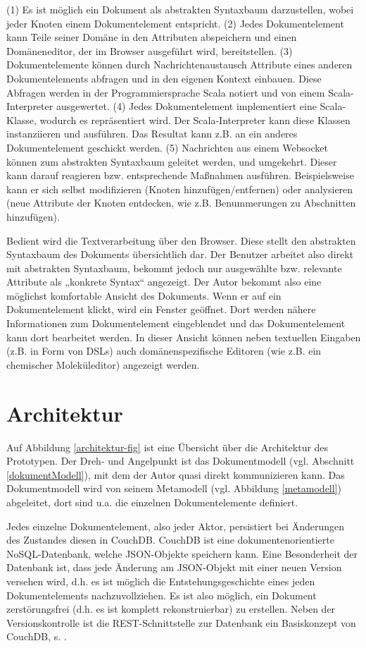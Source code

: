 (1) Es ist möglich ein Dokument als abstrakten Syntaxbaum darzustellen, wobei jeder Knoten einem Dokumentelement entspricht. (2) Jedes Dokumentelement kann Teile seiner Domäne in den Attributen abspeichern und einen Domäneneditor, der im Browser ausgeführt wird, bereitstellen. (3) Dokumentelemente können durch Nachrichtenaustausch Attribute eines anderen Dokumentelements abfragen und in den eigenen Kontext einbauen. Diese Abfragen werden in der Programmiersprache Scala notiert und von einem Scala-Interpreter ausgewertet. (4) Jedes Dokumentelement implementiert eine Scala-Klasse, wodurch es repräsentiert wird. Der Scala-Interpreter kann diese Klassen instanziieren und ausführen. Das Resultat kann z.B. an ein anderes Dokumentelement geschickt werden. (5) Nachrichten aus einem Websocket können zum abstrakten Syntaxbaum geleitet werden, und umgekehrt. Dieser kann darauf reagieren bzw. entsprechende Maßnahmen ausführen. Beispielsweise kann er sich selbst modifizieren (Knoten hinzufügen/entfernen) oder analysieren (neue Attribute der Knoten entdecken, wie z.B. Benummerungen zu Abschnitten hinzufügen).

 
Bedient wird die Textverarbeitung über den Browser. Diese stellt den abstrakten Syntaxbaum des Dokuments übersichtlich dar. Der Benutzer arbeitet also direkt mit abstrakten Syntaxbaum, bekommt jedoch nur ausgewählte bzw. relevante Attribute als „konkrete Syntax“ angezeigt. Der Autor bekommt also eine möglichst komfortable Ansicht des Dokuments. Wenn er auf ein Dokumentelement klickt, wird ein Fenster geöffnet. Dort werden nähere Informationen zum Dokumentelement eingeblendet und das Dokumentelement kann dort bearbeitet werden. In dieser Ansicht können neben textuellen Eingaben (z.B. in Form von DSLs) auch domänenspezifische Editoren (wie z.B. ein chemischer Moleküleditor) angezeigt werden.

 
\section{Architektur}\label{}
 
Auf Abbildung \ref{architektur-fig} ist eine Übersicht über die Architektur des Prototypen. Der Dreh- und Angelpunkt ist das Dokumentmodell (vgl. Abschnitt \ref{dokumentModell}), mit dem der Autor quasi direkt kommunizieren kann. Das Dokumentmodell wird von seinem Metamodell (vgl. Abbildung \ref{metamodell}) abgeleitet, dort sind u.a. die einzelnen Dokumentelemente definiert.

 
Jedes einzelne Dokumentelement, also jeder Aktor, persistiert bei Änderungen des Zustandes diesen in CouchDB. CouchDB ist eine dokumentenorientierte NoSQL-Datenbank, welche JSON-Objekte speichern kann. Eine Besonderheit der Datenbank ist, dass jede Änderung am JSON-Objekt mit einer neuen Version versehen wird, d.h. es ist möglich die Entstehungsgeschichte eines jeden Dokumentelements nachzuvollziehen. Es ist also möglich, ein Dokument zerstörungsfrei (d.h. es ist komplett rekonstruierbar) zu erstellen. Neben der Versionskontrolle ist die REST-Schnittstelle zur Datenbank ein Basiskonzept von CouchDB, s. \citep{Anderson}.

